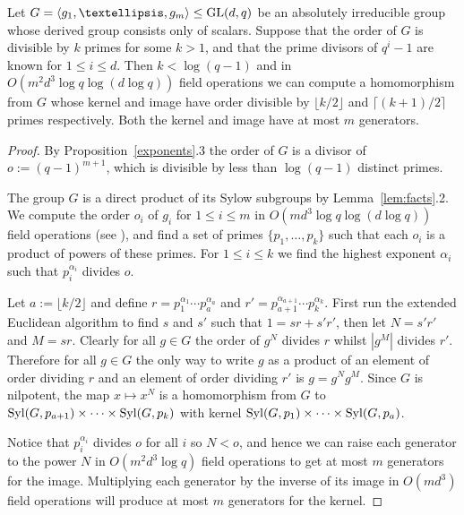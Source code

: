 \begin{Lemm} 
Let $G = \langle g_1, \ldots, g_m \rangle \leq \GL(d, q)$ 
be an absolutely irreducible group whose derived group 
consists only of scalars. Suppose that the order of $G$ 
is divisible by $k$ primes for some $k > 1$, and that 
the prime divisors of $q^i-1$ are known for $1 \leq i \leq d$. 
Then $k < \log (q-1)$ and in  $O(m^2 d^3 \log q \log( d \log q))$ 
field operations we can compute a homomorphism from $G$ 
whose kernel and image have order divisible by $\lfloor k/2 \rfloor$ 
and $\lceil (k+1)/2 \rceil$ primes respectively. Both 
the kernel and image have at most $m$ generators. 
\end{Lemm}

\begin{proof}
By Proposition~\ref{exponents}.3 the order of $G$ is a 
divisor of $o:= (q-1)^{m+1}$, which is divisible by 
less than $\log (q-1)$ distinct primes. 

The group $G$ is a direct product of its Sylow subgroups 
by Lemma~\ref{lem:facts}.2. We compute the order $o_i$ of 
$g_i$ for $1 \leq i \leq m$ in $O(m d^3 \log q \log (d \log q))$ 
field operations (see \cite{CellLeedOrder}), and find a set of 
primes $\{p_1, \ldots, p_k\}$ such that each $o_i$ is 
a product of powers of these primes. 
For $1 \leq i \leq k$ we find the highest exponent $\alpha_i$ 
such that $p_i^{\alpha_i}$ divides $o$. %

Let $a:= \lfloor k/2 \rfloor$ and define $r = p_1^{\alpha_1} \cdots
p_a^{\alpha_a}$ and $r' = p_{a+1}^{\alpha_{a+1}} \cdots p_k^{\alpha_k}$.
First run the extended Euclidean algorithm to find $s$ and $s'$ such
that $1 = sr + s'r'$, then let $N = s'r'$ and $M = sr$. Clearly for all
$g \in G$ the order of $g^N$ divides $r$ whilst $|g^M|$ divides $r'$.
Therefore for all $g \in G$ the only way to write $g$ as a product of
an element of order dividing $r$ and an element of order dividing $r'$
is $g = g^N g^M$. Since $G$ is nilpotent, the map $x \mapsto x^N$ is a
homomorphism from $G$ to $\Syl(G, p_{a+1}) \times \cdots \times \Syl(G,
p_k)$ with kernel $\Syl(G, p_1) \times \cdots \times \Syl(G, p_{a})$.

Notice that $p_i^{\alpha_i}$ divides $o$ for 
all $i$  so  $N < o$, and hence we can raise each 
generator to the power $N$ in $O(m^2 d^3 \log q)$ field 
operations to get at most $m$ generators for the image. 
Multiplying each generator by the inverse of its image 
in $O(m d^3)$ field operations will produce at most $m$ 
generators for the kernel.
\end{proof}



